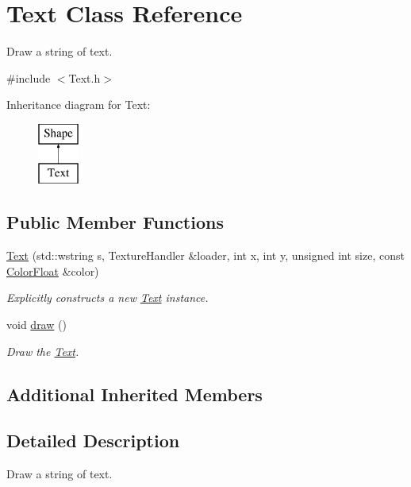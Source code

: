 \hypertarget{class_text}{\section{Text Class Reference}
\label{class_text}
}


Draw a string of text.  




{\ttfamily \#include $<$Text.\+h$>$}

Inheritance diagram for Text\+:\begin{figure}[H]
\begin{center}
\leavevmode
\includegraphics[height=2.000000cm]{class_text}
\end{center}
\end{figure}
\subsection*{Public Member Functions}
\begin{DoxyCompactItemize}
\item 
\hyperlink{class_text_a5f1ef9ca6779f8a01ea78442e4280f55}{Text} (std\+::wstring s, Texture\+Handler \&loader, int x, int y, unsigned int size, const \hyperlink{struct_color_float}{Color\+Float} \&color)
\begin{DoxyCompactList}\small\item\em Explicitly constructs a new \hyperlink{class_text}{Text} instance. \end{DoxyCompactList}\item 
void \hyperlink{class_text_adedc069a9ad622bf9d2cf6d194a01b39}{draw} ()
\begin{DoxyCompactList}\small\item\em Draw the \hyperlink{class_text}{Text}. \end{DoxyCompactList}\end{DoxyCompactItemize}
\subsection*{Additional Inherited Members}


\subsection{Detailed Description}
Draw a string of text. 

